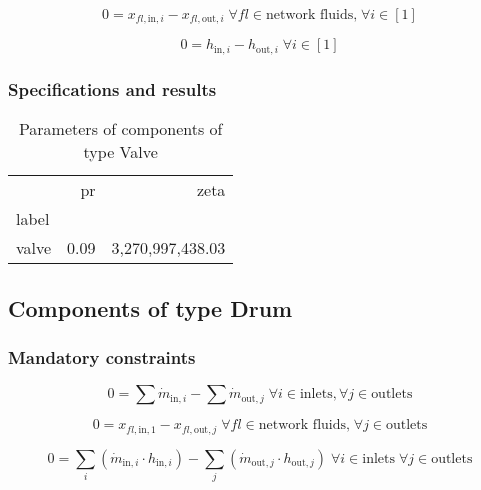 \begin{equation}
\label{eq:Valve_fluid_constraints}
0=x_{fl\mathrm{,in,}i}-x_{fl\mathrm{,out,}i}\;\forall fl \in\text{network fluids,}\; \forall i \in [1]
\end{equation}

\begin{equation}
\label{eq:Valve_enthalpy_equality_constraints}
0=h_{\mathrm{in,}i}-h_{\mathrm{out,}i}\; \forall i \in [1]
\end{equation}


\subsubsection{Specifications and results}

\begin{table}[H]
\centering
\caption{Parameters of components of type Valve}
\begin{tabular}{lrr}
\toprule
{} &    pr &              zeta \\
label &       &                   \\
\midrule
valve &  0.09 &  3,270,997,438.03 \\
\bottomrule
\end{tabular}
\end{table}
\subsection{Components of type Drum}

\subsubsection{Mandatory constraints}

\begin{equation}
\label{eq:Drum_mass_flow_constraints}
0 =\sum\dot{m}_{\mathrm{in},i}-\sum\dot{m}_{\mathrm{out},j}\;\forall i \in \text{inlets}, \forall j \in \text{outlets}
\end{equation}

\begin{equation}
\label{eq:Drum_fluid_constraints}
0 = x_{fl\mathrm{,in,1}} - x_{fl\mathrm{,out,}j}\; \forall fl \in \text{network fluids,} \; \forall j \in\text{outlets}
\end{equation}

\begin{equation}
\label{eq:Drum_energy_balance_constraints}
0=\sum_i\left(\dot{m}_{\mathrm{in,}i}\cdot h_{\mathrm{in,}i}\right) - \sum_j \left(\dot{m}_{\mathrm{out,}j} \cdot h_{\mathrm{out,}j} \right) \; \forall i \in \text{inlets} \;\forall j \in \text{outlets}
\end{equation}

